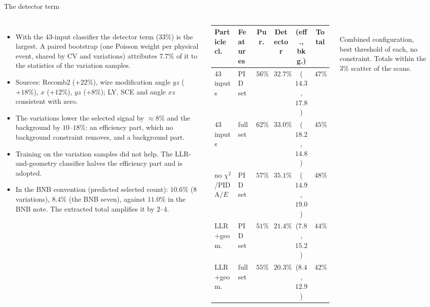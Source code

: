 \documentclass[aspectratio=169,10pt]{beamer}
\begin{document}
\begin{frame}{The detector term}
  \begin{columns}[T]
  \begin{itemize}\footnotesize\setlength\itemsep{2pt}
    \item With the 43-input classifier the detector term ($33\%$) is the largest. A paired bootstrap
          (one Poisson weight per physical event, shared by CV and variations) attributes $7.7\%$ of it to
          the statistics of the variation samples.
    \item Sources: Recomb2 ($+22\%$), wire modification angle $yz$ ($+18\%$), $x$ ($+12\%$), $yz$
          ($+8\%$); LY, SCE and angle $xz$ consistent with zero.
    \item The variations lower the selected signal by $\approx8\%$ and the background by
          $10$--$18\%$: an efficiency part, which no background constraint removes, and a background part.
    \item Training on the variation samples did not help. The LLR-and-geometry classifier halves the
          efficiency part and is adopted.
    \item In the BNB convention (predicted selected count): $10.6\%$ (8 variations), $8.4\%$ (the BNB seven),
          against $11.0\%$ in the BNB note. The extracted total amplifies it by $2$--$4$.
  \end{itemize}
  \scriptsize\setlength{\tabcolsep}{2.5pt}
  \begin{tabular}{llcccc}
    \toprule
    Particle cl. & Features & Pur. & Detector & (eff., bkg.) & Total \\
    \midrule
    43 inputs & PID set  & $56\%$ & $32.7\%$ & ($14.3$, $17.8$) & $47\%$ \\
    43 inputs & full set & $62\%$ & $33.0\%$ & ($18.2$, $14.8$) & $45\%$ \\
    no $\chi^2$/PIDA/$E$ & PID set & $57\%$ & $35.1\%$ & ($14.9$, $19.0$) & $48\%$ \\
    LLR+geom. & PID set  & $51\%$ & $21.4\%$ & ($7.8$, $15.2$) & $44\%$ \\
    LLR+geom. & full set & $55\%$ & $20.3\%$ & ($8.4$, $12.9$) & $42\%$ \\
    \bottomrule
  \end{tabular}\\[1mm]
  {\scriptsize Combined configuration, best threshold of each, no constraint. Totals within the $3\%$ scatter of
  the scans.}
  \end{columns}
\end{frame}
\end{document}
